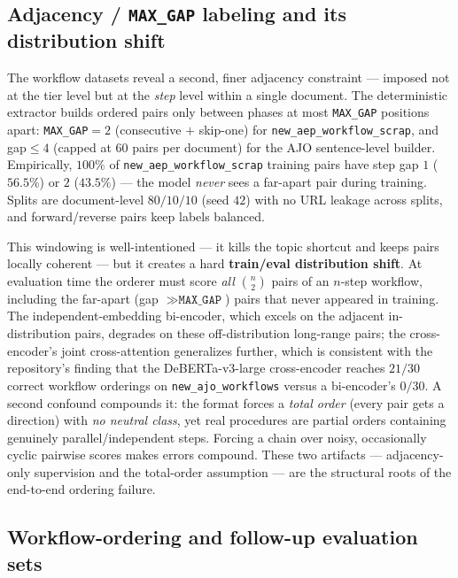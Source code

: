 \subsection{Adjacency / \texttt{MAX\_GAP} labeling and its distribution shift}

The workflow datasets reveal a second, finer adjacency constraint --- imposed not at the
tier level but at the \emph{step} level within a single document. The deterministic
extractor builds ordered pairs only between phases at most \texttt{MAX\_GAP} positions
apart: \texttt{MAX\_GAP}$=2$ (consecutive $+$ skip-one) for
\texttt{new\_aep\_workflow\_scrap}, and gap$\le 4$ (capped at $60$ pairs per document) for
the AJO sentence-level builder. Empirically, $100\%$ of \texttt{new\_aep\_workflow\_scrap}
training pairs have step gap $1$ ($56.5\%$) or $2$ ($43.5\%$) --- the model \emph{never}
sees a far-apart pair during training. Splits are document-level $80/10/10$ (seed $42$)
with no URL leakage across splits, and forward/reverse pairs keep labels balanced.

This windowing is well-intentioned --- it kills the topic shortcut and keeps pairs locally
coherent --- but it creates a hard \textbf{train/eval distribution shift}. At evaluation
time the orderer must score \emph{all} $\binom{n}{2}$ pairs of an $n$-step workflow,
including the far-apart (gap $\gg \texttt{MAX\_GAP}$) pairs that never appeared in
training. The independent-embedding bi-encoder, which excels on the adjacent in-distribution
pairs, degrades on these off-distribution long-range pairs; the cross-encoder's joint
cross-attention generalizes further, which is consistent with the repository's finding that
the DeBERTa-v3-large cross-encoder reaches $21/30$ correct workflow orderings on
\texttt{new\_ajo\_workflows} versus a bi-encoder's $0/30$. A second confound compounds it:
the format forces a \emph{total order} (every pair gets a direction) with \emph{no neutral
class}, yet real procedures are partial orders containing genuinely parallel/independent
steps. Forcing a chain over noisy, occasionally cyclic pairwise scores makes errors
compound. These two artifacts --- adjacency-only supervision and the total-order assumption
--- are the structural roots of the end-to-end ordering failure.

\subsection{Workflow-ordering and follow-up evaluation sets}

